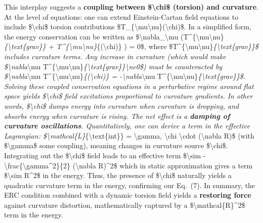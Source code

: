 \documentclass[]{article}
\begin{document}
This interplay suggests a \textbf{coupling between
\$\textbackslash{}chi\$ (torsion) and curvature}. At the level of
equations: one can extend Einstein-Cartan field equations to include
\$\textbackslash{}chi\$ torsion contributions
\$T\_\{\textbackslash{}mu\textbackslash{}nu\}(\textbackslash{}chi)\$. In
a simplified form, the energy conservation can be written as
\$\textbackslash{}nabla\_\textbackslash{}mu
(T\^{}\{\textbackslash{}mu\textbackslash{}nu\}\emph{\{\textbackslash{}text\{grav\}\}
+
T\^{}\{\textbackslash{}mu\textbackslash{}nu\}}\{(\textbackslash{}chi)\}
) = 0\$, where
\$T\^{}\{\textbackslash{}mu\textbackslash{}nu\}\emph{\{\textbackslash{}text\{grav\}\}\$
includes curvature terms. Any increase in curvature (which would make
\$\textbackslash{}nabla}\textbackslash{}mu
T\^{}\{\textbackslash{}mu\textbackslash{}nu\}\emph{\{\textbackslash{}text\{grav\}\}\textbackslash{}ne0\$)
must be counteracted by \$\textbackslash{}nabla}\textbackslash{}mu
T\^{}\{\textbackslash{}mu\textbackslash{}nu\}\emph{\{(\textbackslash{}chi)\}
= -\textbackslash{}nabla}\textbackslash{}mu
T\^{}\{\textbackslash{}mu\textbackslash{}nu\}\emph{\{\textbackslash{}text\{grav\}\}\$.
Solving these coupled conservation equations in a perturbative regime
around flat space yields \$\textbackslash{}chi\$ field excitations
proportional to curvature gradients. In other words,
\$\textbackslash{}chi\$ dumps energy into curvature when curvature is
dropping, and absorbs energy when curvature is rising. The net effect is
a \textbf{damping of curvature oscillations}. Quantitatively, one can
derive a term in the effective Lagrangian:
\$\textbackslash{}mathcal\{L\}}\{\textbackslash{}text\{int\}\} =
\textbackslash{}gamma, \textbackslash{}chi \textbackslash{}cdot
(\textbackslash{}nabla R)\$ (with \$\textbackslash{}gamma\$ some
coupling), meaning changes in curvature source \$\textbackslash{}chi\$.
Integrating out the \$\textbackslash{}chi\$ field leads to an effective
term \$\textbackslash{}sim
-\textbackslash{}frac\{\textbackslash{}gamma\^{}2\}\{2\}
(\textbackslash{}nabla R)\^{}2\$ which in static approximation gives a
term \$\textbackslash{}sim R\^{}2\$ in the energy. Thus, the presence of
\$\textbackslash{}chi\$ naturally yields a quadratic curvature term in
the energy, confirming our Eq.~(7). In summary, the ERC condition
combined with a dynamic torsion field yields a \textbf{restoring force}
against curvature distortion, mathematically captured by a
\$\textbackslash{}mathcal\{R\}\^{}2\$ term in the energy.
\end{document}
